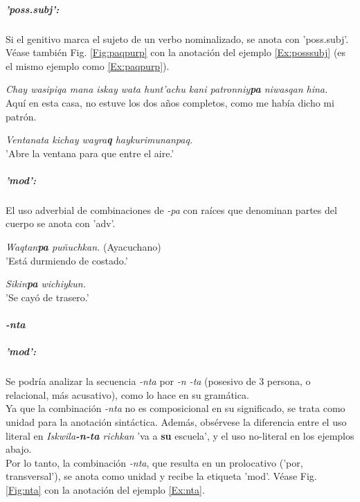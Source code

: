 \documentclass[a4paper,11pt,DIV12]{scrartcl}
\begin{document}
\subparagraph{'poss.subj':} Si el genitivo marca el sujeto de un verbo nominalizado, se anota con 'poss.subj'.
V\'ease tambi\'en Fig. \ref{Fig:paqpurp} con la anotaci\'on del ejemplo \ref{Ex:posssubj} (es el mismo ejemplo como \ref{Ex:paqpurp}).

\begin{examples}
 \item {\em Chay wasipiqa mana iskay wata hunt'achu kani patronniy\textbf{pa} niwasqan hina.}\\
    Aqu\'i en esta casa, no estuve los dos a\~nos completos, como me hab\'ia dicho mi patr\'on.\\
      	 \hfill{\small \citep{Valderrama77}}
 \item\label{Ex:posssubj} {\em Ventanata kichay wayra\textbf{q} haykurimunanpaq.}\\
	'Abre la ventana para que entre el aire.'
        	 \hfill{\small \citep[210]{Cusi2}}
\end{examples}


\subparagraph{'mod':}
El uso adverbial de combinaciones de {\em -pa} con ra\'ices que denominan partes del cuerpo se anota con 'adv'.

\begin{examples}
 \item {\em Waqtan\textbf{pa} pu\~nuchkan.} (Ayacuchano)\\
      'Est\'a durmiendo de costado.'
\item {\em Sikin\textbf{pa} wichiykun.} \\
      'Se cay\'o de trasero.'\\
      	 \hfill{\small \citep[78]{Soto76a}}
\end{examples}


\paragraph{{\em -nta}}\label{Sec:nta}
\subparagraph{'mod':}
Se podr\'ia analizar la secuencia {\em -nta} por {\em -n -ta} (posesivo de 3{\textordfeminine} persona, o relacional, m\'as acusativo), como lo hace \citeauthor[122]{Cusi2} en su gram\'atica. \\
Ya que la combinaci\'on {\em -nta} no es composicional en su significado, se trata como unidad para la anotaci\'on sint\'actica. Adem\'as, obs\'ervese la diferencia entre el uso literal en {\em Iskwila\textbf{-n-ta} richkan} 'va a \textbf{su} escuela', y el uso no-literal en los ejemplos abajo.\\
Por lo tanto, la combinaci\'on {\em -nta}, que resulta en un prolocativo  ('por, transversal'), se anota como unidad y recibe la etiqueta 'mod'. V\'ease Fig. \ref{Fig:nta} con la anotaci\'on del ejemplo \ref{Ex:nta}.
\end{document}
